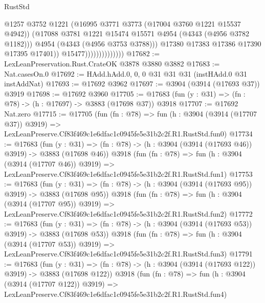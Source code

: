 \begin{lexlean}{RustStd}
\begin{coremodule}
                                      @1257
                                      @3752
                                      @1221
                                      (@16995 @3771 @3773 (@17004 @3760 @1221 @15537 @4942))
                                      (@17088
                                        @3781
                                        @1221
                                        @15474
                                        @15571
                                        @4954
                                        (@4343 (@4956 @3782 @1182)))
                                      @4954
                                      (@4343 (@4956 @3753 @3788)))
                                    @17380
                                    @17383
                                    @17386
                                    @17390
                                    @17395
                                    @17401))
                                @15477))))))))))))))
@17682 := LexLeanPreservation.Rust.CrateOK @3878 @3880 @3882
@17683 := Nat.casesOn.{0}
@17692 := HAdd.hAdd.{0, 0, 0} @31 @31 @31 (instHAdd.{0} @31 instAddNat)
@17693 := @17692 @3962
@17697 := @3904 (@3914 (@17693 @37)) @3919
@17698 := @17692 @3960
@17705 := @17683 (fun (y : @31) => (fn : @78) -> (h : @17697) -> @3883 (@17698 @37)) @3918
@17707 := @17692 Nat.zero
@17715 := @17705
    (fun (fn : @78) =>
    fun (h : @3904 (@3914 (@17707 @37)) @3919) =>
    LexLeanPreserve.Cf83f469c1e6dfac1c0945fe5e31b2c2f.R1.RustStd.fun0)
@17734 := @17683
    (fun (y : @31) => (fn : @78) -> (h : @3904 (@3914 (@17693 @46)) @3919) -> @3883 (@17698 @46))
    @3918
    (fun (fn : @78) =>
    fun (h : @3904 (@3914 (@17707 @46)) @3919) =>
    LexLeanPreserve.Cf83f469c1e6dfac1c0945fe5e31b2c2f.R1.RustStd.fun1)
@17753 := @17683
    (fun (y : @31) => (fn : @78) -> (h : @3904 (@3914 (@17693 @95)) @3919) -> @3883 (@17698 @95))
    @3918
    (fun (fn : @78) =>
    fun (h : @3904 (@3914 (@17707 @95)) @3919) =>
    LexLeanPreserve.Cf83f469c1e6dfac1c0945fe5e31b2c2f.R1.RustStd.fun2)
@17772 := @17683
    (fun (y : @31) => (fn : @78) -> (h : @3904 (@3914 (@17693 @53)) @3919) -> @3883 (@17698 @53))
    @3918
    (fun (fn : @78) =>
    fun (h : @3904 (@3914 (@17707 @53)) @3919) =>
    LexLeanPreserve.Cf83f469c1e6dfac1c0945fe5e31b2c2f.R1.RustStd.fun3)
@17791 := @17683
    (fun (y : @31) => (fn : @78) -> (h : @3904 (@3914 (@17693 @122)) @3919) -> @3883 (@17698 @122))
    @3918
    (fun (fn : @78) =>
    fun (h : @3904 (@3914 (@17707 @122)) @3919) =>
    LexLeanPreserve.Cf83f469c1e6dfac1c0945fe5e31b2c2f.R1.RustStd.fun4)

\end{coremodule}
\end{lexlean}
